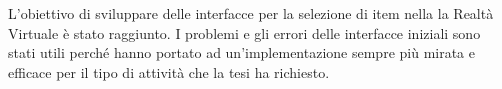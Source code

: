 \documentclass[target=bach,aauheader=]{thud}
\begin{document}
L'obiettivo di sviluppare delle interfacce per la selezione di item nella la Realtà Virtuale è stato raggiunto.
I problemi e gli errori delle interfacce iniziali sono stati utili perché hanno portato ad un'implementazione sempre più mirata e efficace per il tipo di attività che la tesi ha richiesto.


\backmatter




\end{document}
